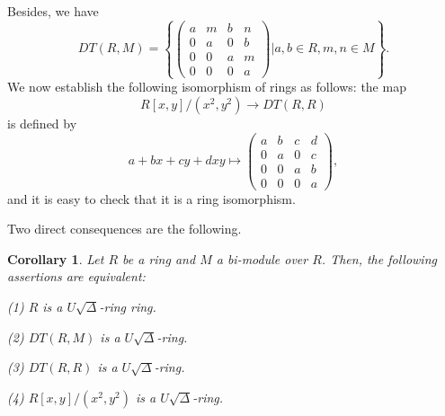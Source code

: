 \documentclass[11pt]{amsart}
\newtheorem{corollary}[theorem]{Corollary}
\theoremstyle{definition}
\begin{document}
Besides, we have $$DT(R, M) =
\left\{\begin{pmatrix}
	a &m &b &n\\
	0 &a &0 &b\\
	0 &0 &a &m\\
	0 &0 &0 &a
\end{pmatrix} |  a,b \in R, m,n \in M\right\}.$$ We now establish the following isomorphism of rings as follows: the map $$R[x, y]/(x^2, y^2) \rightarrow DT(R, R)$$ is defined by $$a + bx + cy + dxy \mapsto
\begin{pmatrix}
	a &b &c &d\\
	0 &a &0 &c\\
	0 &0 &a &b\\
	0 &0 &0 &a
\end{pmatrix},$$
and it is easy to check that it is a ring isomorphism.

\medskip

Two direct consequences are the following.

\begin{corollary}
Let $R$ be a ring and $M$ a bi-module over $R$. Then, the following assertions are equivalent:
	
(1) $R$ is a $U\sqrt{\Delta}$-ring ring.
	
(2) $DT(R, M)$ is a $U\sqrt{\Delta}$-ring.
	
(3) $DT(R, R)$ is a $U\sqrt{\Delta}$-ring.
	
(4) $R[x, y]/(x^2, y^2)$ is a $U\sqrt{\Delta}$-ring.
\end{corollary}
\end{document}
